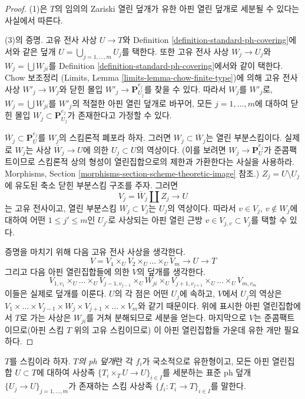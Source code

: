 \begin{proof}
(1)은 $T$의 임의의 Zariski 열린 덮개가 유한 아핀 열린 덮개로 세분될
수 있다는 사실에서 따른다.

\medskip\noindent
(3)의 증명. 고유 전사 사상 $U \to T$와 Definition
\ref{definition-standard-ph-covering}에서와 같은 덮개
$U = \bigcup_{j = 1, \ldots, m} U_j$를 택한다.
또한 고유 전사 사상 $W_j \to U_j$와
$W_j = \bigcup W_{ji}$를 Definition
\ref{definition-standard-ph-covering}에서와 같이 택한다. Chow 보조정리
(Limits, Lemma \ref{limits-lemma-chow-finite-type})에 의해 고유 전사 사상
$W'_j \to W_j$와 닫힌 몰입 $W'_j \to \mathbf{P}^{e_j}_{U_j}$를 찾을 수
있다. 따라서 $W_j$를 $W'_j$로, $W_j = \bigcup W_{ji}$를 $W'_j$의
적절한 아핀 열린 덮개로 바꾸어, 모든 $j = 1, \ldots, m$에 대하여
닫힌 몰입 $W_j \subset \mathbf{P}^{e_j}_{U_j}$가 존재한다고 가정할 수
있다.

\medskip\noindent
$\overline{W}_j \subset \mathbf{P}^{e_j}_U$를 $W_j$의 스킴론적 폐포라
하자. 그러면 $W_j \subset \overline{W}_j$는 열린 부분스킴이다. 실제로
$W_j$는 사상 $\overline{W}_j \to U$에 의한 $U_j \subset U$의 역상이다.
(이를 보려면 $W_j \to \mathbf{P}^{e_j}_U$가 준콤팩트이므로 스킴론적
상의 형성이 열린집합으로의 제한과 가환한다는 사실을 사용하라.
Morphisms, Section \ref{morphisms-section-scheme-theoretic-image} 참조.)
$Z_j = U \setminus U_j$에 유도된 축소 닫힌 부분스킴 구조를 주자. 그러면
$$
V_j = \overline{W}_j \amalg Z_j \to U
$$
는 고유 전사이고, 열린 부분스킴 $W_j \subset V_j$는 $U_j$의 역상이다.
따라서 $v \in V_j$, $v \not \in W_j$에 대하여 어떤
$1 \leq j' \leq m$인 $U_{j'}$로 사상되는 아핀 열린 근방
$v \in V_{j, v} \subset V_j$를 택할 수 있다.

\medskip\noindent
증명을 마치기 위해 다음 고유 전사 사상을 생각한다.
$$
V = V_1 \times_U V_2 \times_U \ldots \times_U V_m
\longrightarrow U \longrightarrow T
$$
그리고 다음 아핀 열린집합들에 의한 $V$의 덮개를 생각한다.
$$
V_{1, v_1} \times_U \ldots \times_U V_{j - 1, v_{j - 1}}
\times_U W_{j i} \times_U
V_{j + 1, v_{j + 1}} \times_U \ldots \times_U V_{m, v_m}
$$
이들은 실제로 덮개를 이룬다. $U$의 각 점은 어떤 $U_j$에 속하고,
$V$에서 $U_j$의 역상은
$V_1 \times \ldots \times V_{j - 1} \times W_j \times V_{j + 1} \times
\ldots \times V_m$와 같기 때문이다. 위에 표시한 아핀 열린집합에서
$T$로 가는 사상은 $W_{ji}$를 거쳐 분해되므로 세분을 얻는다. 마지막으로
$V$는 준콤팩트이므로(아핀 스킴 $T$ 위의 고유 스킴이므로) 이 아핀
열린집합들 가운데 유한 개만 필요하다.
\end{proof}

\begin{definition}
\label{definition-ph-covering}
$T$를 스킴이라 하자. {\it $T$의 ph 덮개}란 각 $f_i$가 국소적으로
유한형이고, 모든 아핀 열린집합 $U \subset T$에 대하여 사상족
$\{T_i \times_T U \to U\}_{i \in I}$를 세분하는 표준 ph 덮개
$\{U_j \to U\}_{j = 1, \ldots, m}$가 존재하는 스킴 사상족
$\{f_i : T_i \to T\}_{i \in I}$를 말한다.
\end{definition}

